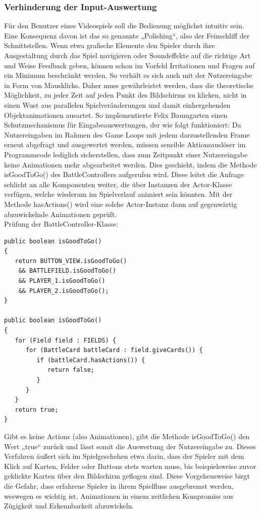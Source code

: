 \subsubsection{Verhinderung der Input-Auswertung}
Für den Benutzer eines Videospiels soll die Bedienung möglichst intuitiv sein. Eine Konsequenz davon ist das so genannte „Polishing“, also der Feinschliff der Schnittstellen. Wenn etwa grafische Elemente den Spieler durch ihre Ausgestaltung durch das Spiel navigieren oder Soundeffekte auf die richtige Art und Weise Feedback geben, können schon im Vorfeld Irritationen und Fragen auf ein Minimum beschränkt werden.
So verhält es sich auch mit der Nutzereingabe in Form von Mausklicks. Daher muss gewährleistet werden, dass die theoretische Möglichkeit, zu jeder Zeit auf jeden Punkt des Bildschirms zu klicken, nicht in einen Wust aus parallelen Spielveränderungen und damit einhergehenden Objektanimationen ausartet.
So implementierte Felix Baumgarten einen Schutzmechanismus für Eingabeauswertungen, der wie folgt funktioniert: Da Nutzereingaben im Rahmen des Game Loops mit jedem darzustellenden Frame erneut abgefragt und ausgewertet werden, müssen sensible Aktionsauslöser im Programmcode lediglich sicherstellen, dass zum Zeitpunkt einer Nutzereingabe keine Animationen mehr abgearbeitet werden. Dies geschieht, indem die Methode isGoodToGo() des BattleControllers aufgerufen wird. Diese leitet die Anfrage schlicht an alle Komponenten weiter, die über Instanzen der Actor-Klasse verfügen, welche wiederum im Spielverlauf animiert sein könnten. Mit der Methode hasActions() wird eine solche Actor-Instanz dann auf gegenwärtig abzuwickelnde Animationen geprüft. \\
Prüfung der BattleController-Klasse:
\begin{lstlisting}
public boolean isGoodToGo()
{
   return BUTTON_VIEW.isGoodToGo() 
	&& BATTLEFIELD.isGoodToGo() 
	&& PLAYER_1.isGoodToGo() 
	&& PLAYER_2.isGoodToGo();
}

public boolean isGoodToGo()
{
   for (Field field : FIELDS) {
      for (BattleCard battleCard : field.giveCards()) {
         if (battleCard.hasActions()) {
            return false;
         }
      }
   }
   return true;
}
\end{lstlisting}
Gibt es keine Actions (also Animationen), gibt die Methode isGoodToGo() den Wert „true“ zurück und lässt somit die Auswertung der Nutzereingabe zu. Dieses Verfahren äußert sich im Spielgeschehen etwa darin, dass der Spieler mit dem Klick auf Karten, Felder oder Buttons stets warten muss, bis beispielsweise zuvor geklickte Karten über den Bildschirm geflogen sind.
Diese Vorgehensweise birgt die Gefahr, dass erfahrene Spieler in ihrem Spielfluss ausgebremst werden, weswegen es wichtig ist, Animationen in einem zeitlichen Kompromiss aus Zügigkeit und Erkennbarkeit abzuwickeln.

